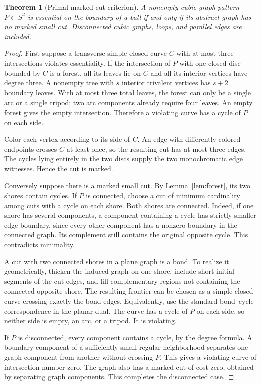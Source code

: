 \documentclass[11pt]{article}
\newtheorem{theorem}{Theorem}[section]
\theoremstyle{remark}\newtheorem{remark}[theorem]{Remark}
\begin{document}
\begin{theorem}[Primal marked-cut criterion]
\label{thm:ball}
A nonempty cubic graph pattern $P\subset S^2$ is essential on the boundary of a ball if and only if its abstract graph has no marked small cut. Disconnected cubic graphs, loops, and parallel edges are included.
\end{theorem}
\begin{proof}
First suppose a transverse simple closed curve $C$ with at most three intersections violates essentiality. If the intersection of $P$ with one closed disc bounded by $C$ is a forest, all its leaves lie on $C$ and all its interior vertices have degree three. A nonempty tree with $s$ interior trivalent vertices has $s+2$ boundary leaves. With at most three total leaves, the forest can only be a single arc or a single tripod; two arc components already require four leaves. An empty forest gives the empty intersection. Therefore a violating curve has a cycle of $P$ on each side.

Color each vertex according to its side of $C$. An edge with differently colored endpoints crosses $C$ at least once, so the resulting cut has at most three edges. The cycles lying entirely in the two discs supply the two monochromatic edge witnesses. Hence the cut is marked.

Conversely suppose there is a marked small cut. By Lemma~\ref{lem:forest}, its two shores contain cycles. If $P$ is connected, choose a cut of minimum cardinality among cuts with a cycle on each shore. Both shores are connected. Indeed, if one shore has several components, a component containing a cycle has strictly smaller edge boundary, since every other component has a nonzero boundary in the connected graph. Its complement still contains the original opposite cycle. This contradicts minimality.

A cut with two connected shores in a plane graph is a bond. To realize it geometrically, thicken the induced graph on one shore, include short initial segments of the cut edges, and fill complementary regions not containing the connected opposite shore. The resulting frontier can be chosen as a simple closed curve crossing exactly the bond edges. Equivalently, use the standard bond--cycle correspondence in the planar dual. The curve has a cycle of $P$ on each side, so neither side is empty, an arc, or a tripod. It is violating.

If $P$ is disconnected, every component contains a cycle, by the degree formula. A boundary component of a sufficiently small regular neighborhood separates one graph component from another without crossing $P$. This gives a violating curve of intersection number zero. The graph also has a marked cut of cost zero, obtained by separating graph components. This completes the disconnected case.
\end{proof}
\end{document}
